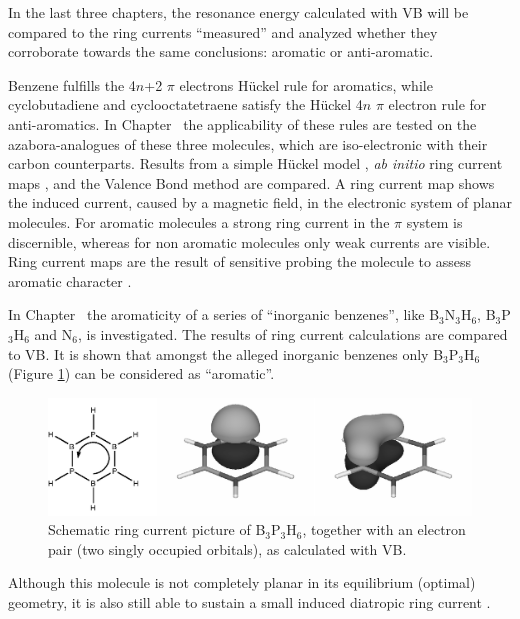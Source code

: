 In the last three chapters, the resonance energy calculated with VB will be compared to the ring currents ``measured'' and analyzed whether they corroborate towards the same conclusions: aromatic or anti-aromatic.

Benzene fulfills the 4$n$+2 $\pi$ electrons H\"{u}ckel rule for aromatics, while cyclobutadiene and cyclooctatetraene satisfy the H\"{u}ckel 4$n$ $\pi$ electron rule for anti-aromatics. In Chapter \chhuckel\ the applicability of these rules are tested on the azabora-analogues of these three molecules, which are iso-electronic with their carbon counterparts. Results from a simple H\"{u}ckel model \cite{huckel1,huckel2,huckel3,huckel4}, \textit{ab initio} ring current maps \cite{london,ctocd}, and the Valence Bond method are compared. A ring current map shows the induced current, caused by a magnetic field, in the electronic system of planar molecules. For aromatic molecules a strong ring current in the $\pi$ system is discernible, whereas for non aromatic molecules only weak currents are visible. Ring current maps are the result of sensitive probing the molecule to assess aromatic character \cite{huckel}.

In Chapter \chinorganic\ the aromaticity of a series of ``inorganic benzenes'', like B$_3$N$_3$H$_6$, B$_3$P$_3$H$_6$ and N$_6$, is investigated. The results of ring current calculations are compared to VB. It is shown that amongst the alleged inorganic benzenes only B$_3$P$_3$H$_6$ (Figure \ref{ch1.fig.b3p3h6}) can be considered as ``aromatic''.
\begin{figure}[ht]
\center
\includegraphics[width=5in]{introduction/figures/b3p3h6.eps}
\caption{Schematic ring current picture of B$_3$P$_3$H$_6$, together with an electron pair (two singly occupied orbitals), as calculated with VB.}
\label{ch1.fig.b3p3h6}
\end{figure}
 Although this molecule is not completely planar in its equilibrium (optimal) geometry, it is also still able to sustain a small induced diatropic ring current \cite{inorganic}.

